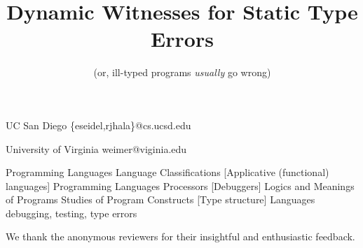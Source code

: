 \documentclass[9pt,numbers]{sigplanconf}
\theoremstyle{plain}%
\theoremstyle{definition}
\newcommand{\isTechReport}{false} %
\newcommand\includeTechReport[1]{%
  \ifthenelse{\equal{\isTechReport}{true}}
    {{#1}}
    {\ignorespaces}
\xspace}
\begin{document}
\toappear{}

\title{Dynamic Witnesses for Static Type Errors}

\subtitle{(or, ill-typed programs \emph{usually} go wrong)}

           {UC San Diego}
           {\{eseidel,rjhala\}@cs.ucsd.edu}

           {University of Virginia}
           {weimer@viginia.edu}

\maketitle





         {Programming Languages}
         {Language Classifications}
         [Applicative (functional) languages]
         {Programming Languages}
         {Processors}
         [Debuggers]
         {Logics and Meanings of Programs}
         {Studies of Program Constructs}
         [Type structure]
\terms
Languages
\keywords
debugging, testing, type errors






% 
% 

% 

\acks
%
We thank the anonymous reviewers for their insightful and enthusiastic feedback.

{


}

\includeTechReport
{

\appendix

%
}
\end{document}
